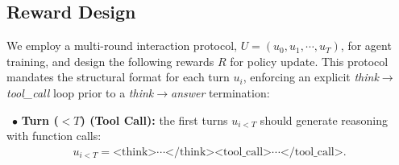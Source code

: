 \subsection{Reward Design}
We employ a multi-round interaction protocol, $U=(u_0,u_1,\cdots,u_{T})$, for agent training, and design the following rewards $R$ for policy update. This protocol mandates the structural format for each turn $u_i$, enforcing an explicit \textit{think}$\rightarrow$\textit{tool\_call} loop prior to a \textit{think}$\rightarrow$\textit{answer} termination:

\noindent~$\bullet$ \textbf{Turn ($<T$) (Tool Call):} the first turns $u_{i<T}$ should generate reasoning with function calls: 
\begin{equation*}
    \begin{aligned} u_{i<T}=\text{<think>}\cdots\text{</think>}\text{<tool\_call>}\cdots\text{</tool\_call>}.
    \end{aligned}
\end{equation*}

